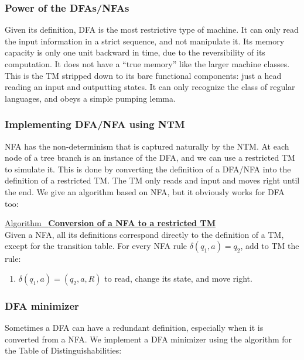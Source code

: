 \documentclass[12pt]{article}  %
\newcommand{\algtitle}[1]{\underline{Algorithm \ {\bf #1}} \vspace*{1mm}\\}
\begin{document}
\subsubsection{Power of the DFAs/NFAs}

Given its definition, DFA is the most restrictive type of machine. It can only read the input information in a strict sequence, and not manipulate it. Its memory capacity is only one unit backward in time, due to the reversibility of its computation. It does not have a ``true memory'' like the larger machine classes. This is the TM stripped down to its bare functional components: just a head reading an input and outputting states. It can only recognize the class of regular languages, and obeys a simple pumping lemma.


\subsubsection{Implementing DFA/NFA using NTM}
NFA has the non-determinism that is captured naturally by the NTM. At each node of a tree branch is an instance of the DFA, and we can use a restricted TM to simulate it. This is done by converting the definition of a DFA/NFA into the definition of a restricted TM. The TM only reads and input and moves right until the end. We give an algorithm based on NFA, but it obviously works for DFA too:

\algtitle{Conversion of a NFA to a restricted TM}
Given a NFA, all its definitions correspond directly to the definition of a TM, except for the transition table. For every NFA rule $\delta(q_1, a) = q_2$, add to TM the rule:
\begin{enumerate}
	\item $\delta(q_1, a) = (q_2, a, R)$ to read, change its state, and move right.
\end{enumerate}



\subsubsection{DFA minimizer}
Sometimes a DFA can have a redundant definition, especially when it is converted from a NFA. We implement a DFA minimizer using the algorithm for the Table of Distinguishabilities:
\end{document}
